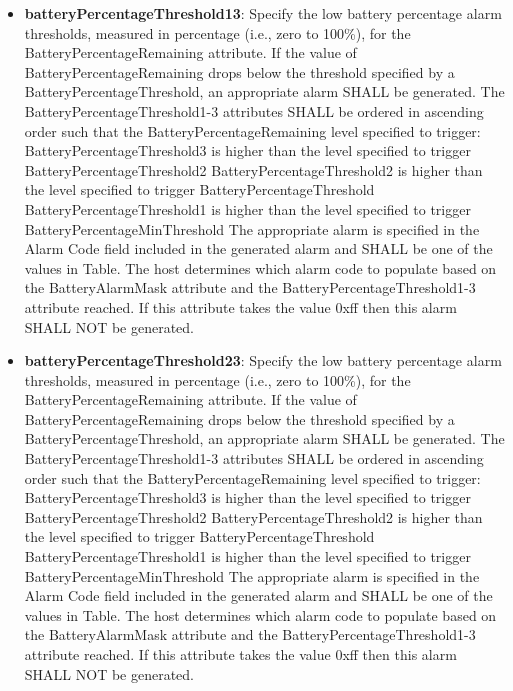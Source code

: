 \begin{itemize}
\item \textbf{batteryPercentageThreshold13}: Specify the low battery percentage alarm thresholds, measured in percentage (i.e., zero to 100\%), for the BatteryPercentageRemaining attribute. If the value of BatteryPercentageRemaining drops below the threshold specified by a BatteryPercentageThreshold, an appropriate alarm SHALL be generated. The BatteryPercentageThreshold1-3 attributes SHALL be ordered in ascending order such that the BatteryPercentageRemaining level specified to trigger: BatteryPercentageThreshold3 is higher than the level specified to trigger BatteryPercentageThreshold2 BatteryPercentageThreshold2 is higher than the level specified to trigger BatteryPercentageThreshold BatteryPercentageThreshold1 is higher than the level specified to trigger BatteryPercentageMinThreshold The appropriate alarm is specified in the Alarm Code field included in the generated alarm and SHALL be one of the values in Table. The host determines which alarm code to populate based on the BatteryAlarmMask attribute and the BatteryPercentageThreshold1-3 attribute reached. If this attribute takes the value 0xff then this alarm SHALL NOT be generated.
\item \textbf{batteryPercentageThreshold23}: Specify the low battery percentage alarm thresholds, measured in percentage (i.e., zero to 100\%), for the BatteryPercentageRemaining attribute. If the value of BatteryPercentageRemaining drops below the threshold specified by a BatteryPercentageThreshold, an appropriate alarm SHALL be generated. The BatteryPercentageThreshold1-3 attributes SHALL be ordered in ascending order such that the BatteryPercentageRemaining level specified to trigger: BatteryPercentageThreshold3 is higher than the level specified to trigger BatteryPercentageThreshold2 BatteryPercentageThreshold2 is higher than the level specified to trigger BatteryPercentageThreshold BatteryPercentageThreshold1 is higher than the level specified to trigger BatteryPercentageMinThreshold The appropriate alarm is specified in the Alarm Code field included in the generated alarm and SHALL be one of the values in Table. The host determines which alarm code to populate based on the BatteryAlarmMask attribute and the BatteryPercentageThreshold1-3 attribute reached. If this attribute takes the value 0xff then this alarm SHALL NOT be generated.

\end{itemize}
